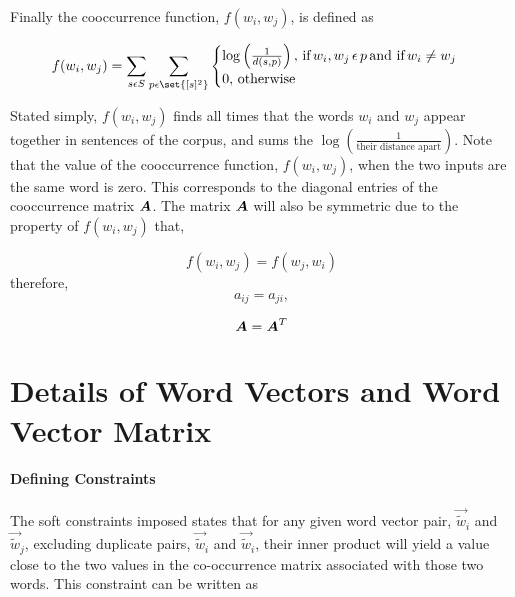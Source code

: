 \documentclass{article}
\begin{document}
Finally the cooccurrence function, $f(w_i, w_j)$, is defined as

\begin{equation*}
f(w_i,w_j) = 
\sum_{s \epsilon S} { \sum_{p \epsilon \set{[s]^2} } {
\begin{cases}
\log \left(\frac{1}{d(s,p)} \right), \, \text{if} \, w_i, w_j \, \epsilon \, p \, \text{and if} \, w_i \neq w_j
\\
0, \, \text{otherwise}
\end{cases}
} }
\end{equation*}

Stated simply, $f(w_i, w_j)$ finds all times that the words $w_i$ and $w_j$ appear together in sentences of the corpus, and sums the $\log \left( \frac{1}{\text{their distance apart}} \right)$. Note that the value of the cooccurrence function, $f(w_i, w_j)$, when the two inputs are the same word is zero. This corresponds to the diagonal entries of the cooccurrence matrix $\boldsymbol{A}$. The matrix $\boldsymbol{A}$ will also be symmetric due to the property of $f(w_i, w_j)$ that,

\begin{equation*}
f(w_i,w_j) = f(w_j,w_i)
\end{equation*}
therefore,
\begin{equation*}
a_{ij} = a_{ji},
\end{equation*}

\begin{equation*}
\boldsymbol{A} = \boldsymbol{A}^T
\end{equation*}


%
%

\section{Details of Word Vectors and Word Vector Matrix}

\paragraph{Defining Constraints} The soft constraints imposed states that for any given word vector pair, $\vec{\tilde{w}}_{i}$ and $\vec{\tilde{w}}_{j}$, excluding duplicate pairs, $\vec{\tilde{w}}_{i}$ and $\vec{\tilde{w}}_{i}$, their inner product will yield a value close to the two values in the co-occurrence matrix associated with those two words. This constraint can be written as
		
\end{document}
